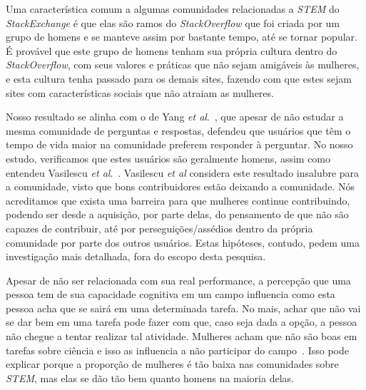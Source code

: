 
Uma característica comum a algumas comunidades relacionadas a \emph{STEM} do \emph{StackExchange} é que elas são ramos do \emph{StackOverflow} que foi criada por um grupo de homens e se manteve assim por bastante tempo, até se tornar popular. É provável que este grupo de homens tenham sua própria cultura dentro do \emph{StackOverflow}, com seus valores e práticas que não sejam amigáveis às mulheres, e esta cultura tenha passado para os demais sites, fazendo com que estes sejam sites com características sociais que não atraiam as mulheres.

Nosso resultado se alinha com o de Yang \textit{et al}.~\cite{yang2010activity}, que apesar de não estudar a mesma comunidade de perguntas e respostas, defendeu que usuários que têm o tempo de vida maior na comunidade preferem responder à perguntar. No nosso estudo, verificamos que estes usuários são geralmente homens, assim como entendeu Vasilescu \textit{et al}.~\cite{Vasilescu27092013}. Vasilescu \textit{et al} considera este resultado insalubre para a comunidade, visto que bons contribuidores estão deixando a comunidade. Nós acreditamos que exista uma barreira para que mulheres continue contribuindo, podendo ser desde a aquisição, por parte delas, do pensamento de que não são capazes de contribuir, até por perseguições/assédios dentro da própria comunidade por parte dos outros usuários. Estas hipóteses, contudo, pedem uma investigação mais detalhada, fora do escopo desta pesquisa.

Apesar de não ser relacionada com sua real performance, a percepção que uma pessoa tem de sua capacidade cognitiva em um campo influencia como esta pessoa acha que se sairá em uma determinada tarefa. No mais, achar que não vai se dar bem em uma tarefa pode fazer com que, caso seja dada a opção, a pessoa não chegue a tentar realizar tal atividade. Mulheres acham que não são boas em tarefas sobre ciência e isso as influencia a não participar do campo~\cite{ehrlinger2003chronic}. Isso pode explicar porque a proporção de mulheres é tão baixa nas comunidades sobre \emph{STEM}, mas elas se dão tão bem quanto homens na maioria delas.


